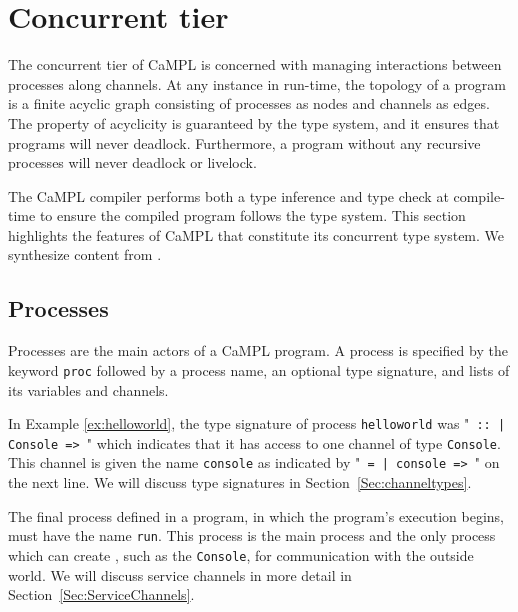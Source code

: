 \documentclass[11pt]{article}
\begin{document}
\section{Concurrent tier}
\label{Sec:ConcurrentTypes}

The concurrent tier of CaMPL is concerned with managing interactions between processes along channels.
At any instance in run-time, the topology of a program is a finite acyclic graph consisting of processes as nodes and channels as edges. 
The property of acyclicity is guaranteed by the type system, and it ensures that programs will never deadlock.
Furthermore, a program without any recursive processes will never deadlock or livelock.

The CaMPL compiler performs both a type inference and type check at compile-time to ensure the compiled program follows the type system.
This section highlights the features of CaMPL that constitute its concurrent type system.
We synthesize content from \cite{Ku18, Po21, Po22, No25}.

\subsection{Processes}
\label{Sec:Processes}

Processes are the main actors of a CaMPL program.
A process is specified by the keyword \lstinline$proc$ followed by a process name, an optional type signature, and lists of its variables and channels.

In Example \ref{ex:helloworld}, the type signature of process \lstinline$helloworld$ was "\lstinline$ :: | Console => $" which indicates that it has access to one channel of type \lstinline$Console$.
This channel is given the name \lstinline$console$ as indicated by "\lstinline$ = | console => $" on the next line.
We will discuss type signatures in Section~\ref{Sec:channeltypes}.

The final process defined in a program, in which the program's execution begins, must have the name \lstinline$run$. 
This process is the main process and the only process which can create , such as the \lstinline$Console$, for communication with the outside world.
We will discuss service channels in more detail in Section~\ref{Sec:ServiceChannels}.
\end{document}
